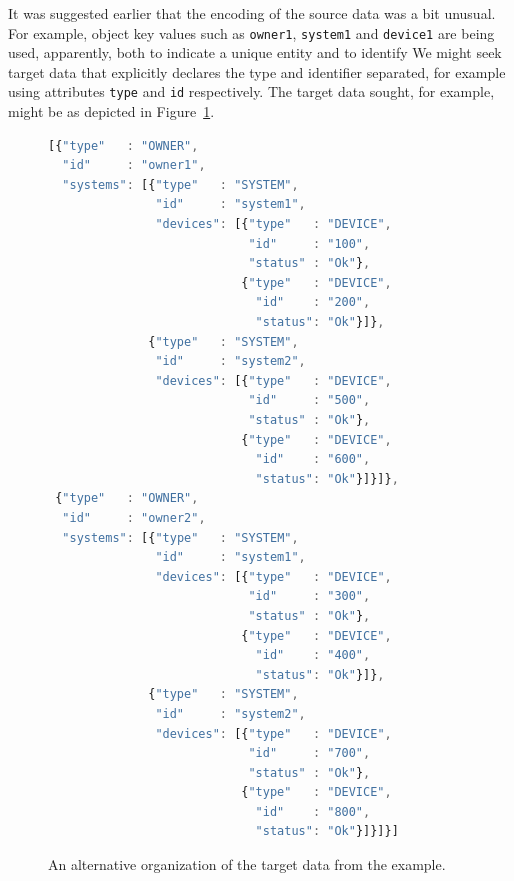 \documentclass[10pt,letterpaper]{article} %
\newcommand{\stt}[1]{\texttt{#1}} %
\begin{document}
It was suggested earlier that the encoding of the source data was a bit unusual.
For example, object key values such as \stt{owner1}, \stt{system1} and \stt{device1} are being used, apparently, both to indicate a unique entity and to identify %
We might seek target data that explicitly declares the type and identifier separated, for example using attributes \stt{type} and \stt{id} respectively.
The target data sought, for example, might be as depicted in Figure~\ref{data:slack-with-keys}.

\begin{figure}[H]
  \caption{An alternative organization of the target data from the example.}
 \label{data:slack-with-keys}
\begin{lstlisting}[language=JavaScript,basicstyle=\ttfamily\scriptsize,numberstyle=\scriptsize]
[{"type"   : "OWNER",
  "id"     : "owner1",
  "systems": [{"type"   : "SYSTEM",
               "id"     : "system1",
               "devices": [{"type"   : "DEVICE",
                            "id"     : "100",
                            "status" : "Ok"},
                           {"type"   : "DEVICE",
                             "id"    : "200",
                             "status": "Ok"}]},
              {"type"   : "SYSTEM",
               "id"     : "system2",
               "devices": [{"type"   : "DEVICE",
                            "id"     : "500",
                            "status" : "Ok"},
                           {"type"   : "DEVICE",
                             "id"    : "600",
                             "status": "Ok"}]}]},
 {"type"   : "OWNER",
  "id"     : "owner2",
  "systems": [{"type"   : "SYSTEM",
               "id"     : "system1",
               "devices": [{"type"   : "DEVICE",
                            "id"     : "300",
                            "status" : "Ok"},
                           {"type"   : "DEVICE",
                             "id"    : "400",
                             "status": "Ok"}]},
              {"type"   : "SYSTEM",
               "id"     : "system2",
               "devices": [{"type"   : "DEVICE",
                            "id"     : "700",
                            "status" : "Ok"},
                           {"type"   : "DEVICE",
                             "id"    : "800",
                             "status": "Ok"}]}]}]
\end{lstlisting}
\end{figure}  \vspace{-2em}
\end{document}
